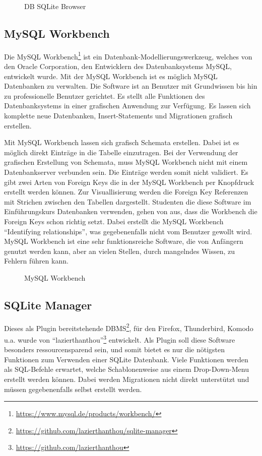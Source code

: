 \begin{figure}[ht]
        \centering
        \caption{DB SQLite Browser}
        \label{pic:sqlite_browser}
\end{figure}


\subsection{MySQL Workbench}
\label{sec02:mysql_workbench}
Die MySQL Workbench\footnote{\url{https://www.mysql.de/products/workbench/}} ist ein Datenbank-Modellierungswerkzeug, welches von den Oracle Corporation, den Entwicklern des Datenbanksystems MySQL, entwickelt wurde.
Mit der MySQL Workbench ist es möglich MySQL Datenbanken zu verwalten. Die Software ist an Benutzer mit Grundwissen bis hin zu professionelle Benutzer gerichtet. Es stellt alle Funktionen des Datenbanksystems in einer grafischen Anwendung zur Verfügung. Es lassen sich komplette neue Datenbanken, Insert-Statements und Migrationen grafisch erstellen.

Mit MySQL Workbench lassen sich grafisch Schemata erstellen. Dabei ist es möglich direkt Einträge in die Tabelle einzutragen. Bei der Verwendung der grafischen Erstellung von Schemata, muss MySQL Workbench nicht mit einem Datenbankserver verbunden sein. Die Einträge werden somit nicht validiert. Es gibt zwei Arten von Foreign Keys die in der MySQL Workbench per Knopfdruck erstellt werden können. Zur Visuallisierung werden die Foreign Key Referenzen mit Strichen zwischen den Tabellen dargestellt. Studenten die diese Software im Einführungskurs Datenbanken verwenden, gehen von aus, dass die Workbench die Foreign Keys schon richtig setzt. Dabei erstellt die MySQL Workbench ``Identifying relationships'', was gegebenenfalls nicht vom Benutzer gewollt wird.
MySQL Workbench ist eine sehr funktionsreiche Software, die von Anfängern genutzt werden kann, aber an vielen Stellen, durch mangelndes Wissen, zu Fehlern führen kann. 
\begin{figure}[ht]
        \centering
        \caption{MySQL Workbench}
        \label{pic:mysql_workbench}
\end{figure}

\subsection{SQLite Manager}
\label{sec02:sqlite_manager}
Dieses als Plugin bereitstehende DBMS\footnote{\url{https://github.com/lazierthanthou/sqlite-manager}}, für den Firefox, Thunderbird, Komodo u.a. wurde von ``lazierthanthou''\footnote{\url{https://github.com/lazierthanthou}} entwickelt. Als Plugin soll diese Software besonders ressourcensparend sein, und somit bietet es nur die nötigsten Funktionen zum Verwenden einer SQLite Datenbank. Viele Funktionen werden als SQL-Befehle erwartet, welche Schablonenweise aus einem Drop-Down-Menu erstellt werden können.
Dabei werden Migrationen nicht direkt unterstützt und müssen gegebenenfalls selbst erstellt werden.

